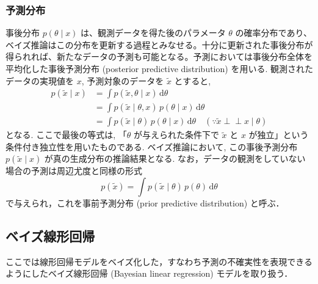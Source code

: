 \documentclass[titlepage]{ltjsbook}
\begin{document}
\subsubsection{予測分布}
事後分布 $p(\theta \mid x)$ は、観測データを得た後のパラメータ $\theta$ の確率分布であり、ベイズ推論はこの分布を更新する過程とみなせる。十分に更新された事後分布が得られれば、新たなデータの予測も可能となる。予測においては事後分布全体を平均化した事後予測分布 (posterior predictive distribution) を用いる. 観測されたデータの実現値を $x$, 予測対象のデータを $\tilde{x}$ とすると, 
\begin{align}
p(\tilde{x} \mid x)
&= \int p(\tilde{x}, \theta \mid x) \, \mathrm{d}\theta\\
&= \int p(\tilde{x} \mid \theta, x) \, p(\theta \mid x) \, \mathrm{d}\theta \\
&= \int p(\tilde{x} \mid \theta) \, p(\theta \mid x) \, \mathrm{d}\theta
\quad (\because \tilde{x} \perp\!\!\!\perp x \mid \theta)
\end{align}
となる. ここで最後の等式は, 「$\theta$ が与えられた条件下で $\tilde{x}$ と $x$ が独立」という条件付き独立性を用いたものである. ベイズ推論において, この事後予測分布 $p(\tilde{x} \mid x)$ が真の生成分布の推論結果となる. なお，データの観測をしていない場合の予測は周辺尤度と同様の形式
\begin{equation}
p(\tilde{x}) = \int p(\tilde{x} \mid \theta)\, p(\theta)\, \mathrm{d}\theta
\end{equation}
で与えられ，これを事前予測分布 (prior predictive distribution) と呼ぶ．

\subsection{ベイズ線形回帰}
ここでは線形回帰モデルをベイズ化した，すなわち予測の不確実性を表現できるようにしたベイズ線形回帰 (Bayesian linear regression) モデルを取り扱う．
\end{document}
